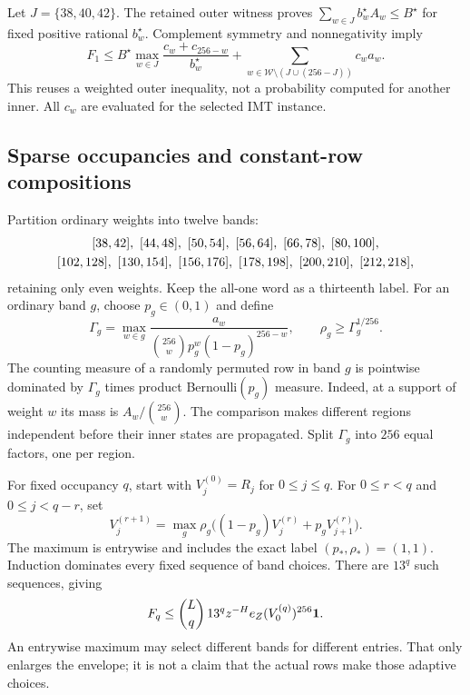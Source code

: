 Let $J=\{38,40,42\}$. The retained outer witness proves
$\sum_{w\in J}b_w^\star A_w\le B^\star$ for fixed positive rational
$b_w^\star$. Complement symmetry and nonnegativity imply
\begin{equation}
 F_1\le
 B^\star\max_{w\in J}\frac{c_w+c_{256-w}}{b_w^\star}
 +\sum_{w\in\mathcal W\setminus(J\cup(256-J))}c_w a_w.
 \label{eq:finite-q1-domination}
\end{equation}
This reuses a weighted outer inequality, not a probability computed for
another inner. All $c_w$ are evaluated for the selected IMT instance.

\subsection{Sparse occupancies and constant-row compositions}

Partition ordinary weights into twelve bands:
\[
\begin{gathered}
\relax[38,42],\ [44,48],\ [50,54],\ [56,64],\ [66,78],\ [80,100],\\
[102,128],\ [130,154],\ [156,176],\ [178,198],\ [200,210],\ [212,218],
\end{gathered}
\]
retaining only even weights. Keep the all-one word as a thirteenth label.
For an ordinary band $g$, choose $p_g\in(0,1)$ and define
\[
 \Gamma_g=\max_{w\in g}
 \frac{a_w}{\binom{256}{w}p_g^w(1-p_g)^{256-w}},
 \qquad \rho_g\ge\Gamma_g^{1/256}.
\]
The counting measure of a randomly permuted row in band $g$ is pointwise
dominated by $\Gamma_g$ times product Bernoulli$(p_g)$ measure.
Indeed, at a support of weight $w$ its mass is $A_w/\binom{256}{w}$.
The comparison makes different regions independent before their inner states
are propagated. Split $\Gamma_g$ into $256$ equal factors, one per region.

For fixed occupancy $q$, start with $V_j^{(0)}=R_j$ for $0\le j\le q$.
For $0\le r<q$ and $0\le j<q-r$, set
\[
 V_j^{(r+1)}=
 \max_g \rho_g\bigl((1-p_g)V_j^{(r)}+p_gV_{j+1}^{(r)}\bigr).
\]
The maximum is entrywise and includes the exact label $(p_*,\rho_*)=(1,1)$.
Induction dominates every fixed sequence of band choices. There are $13^q$
such sequences, giving
\begin{equation}
 F_q\le\binom Lq\,13^qz^{-H}e_Z(V_0^{(q)})^{256}\mathbf 1.
 \label{eq:finite-sparse-bound}
\end{equation}
An entrywise maximum may select different bands for different entries.
That only enlarges the envelope; it is not a claim that the actual rows
make those adaptive choices.


